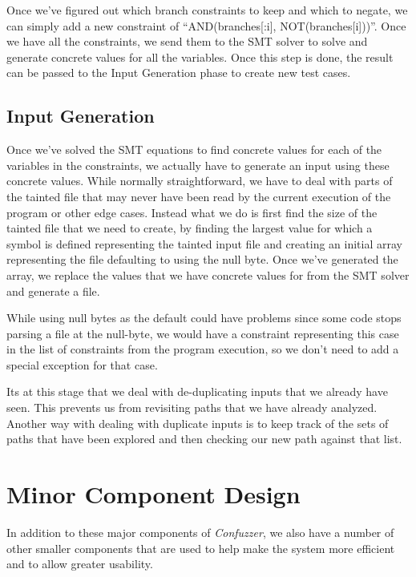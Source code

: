 Once we've figured out which branch constraints to keep and which to negate, we
can simply add a new constraint of ``AND(branches[:i], NOT(branches[i]))''. Once
we have all the constraints, we send them to the SMT solver to solve and
generate concrete values for all the variables. Once this step is done, the
result can be passed to the Input Generation phase to create new test cases.

\subsection{Input Generation}
Once we've solved the SMT equations to find concrete values for each of the
variables in the constraints, we actually have to generate an input using these
concrete values. While normally straightforward, we have to deal with parts of
the tainted file that may never have been read by the current execution of the
program or other edge cases. Instead what we do is first find the size of the
tainted file that we need to create, by finding the largest value for which a
symbol is defined representing the tainted input file and creating an initial
array representing the file defaulting to using the null byte. Once we've
generated the array, we replace the values that we have concrete values for from
the SMT solver and generate a file.

While using null bytes as the default could have problems since some code stops
parsing a file at the null-byte, we would have a constraint representing this
case in the list of constraints from the program execution, so we don't need to
add a special exception for that case.

Its at this stage that we deal with de-duplicating inputs that we already have
seen. This prevents us from revisiting paths that we have already
analyzed. Another way with dealing with duplicate inputs is to keep track of the
sets of paths that have been explored and then checking our new path against
that list.

\section{Minor Component Design}
In addition to these major components of \textit{Confuzzer}, we also have a
number of other smaller components that are used to help make the system more
efficient and to allow greater usability.

